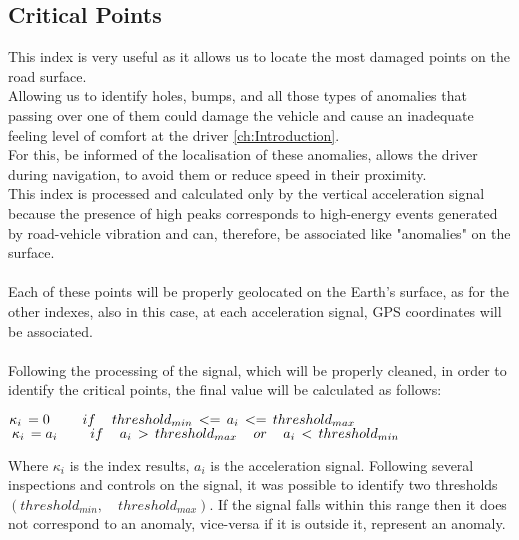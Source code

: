 \documentclass[tesi]{subfiles}
\begin{document}
\subsection{Critical Points}\label{ssc:Critical Points}
This index is very useful as it allows us to locate the most damaged points on the road surface.\\
\noindent Allowing us to identify holes, bumps, and all those types of anomalies that passing over one of them could damage the vehicle and cause an inadequate feeling level of comfort at the driver \ref{ch:Introduction}.\\For this, be informed of the localisation of these anomalies,  allows the driver during navigation, to avoid them or reduce speed in their proximity.\\
\noindent This index is processed and calculated only by the vertical acceleration signal because the presence of high peaks corresponds to high-energy events generated by road-vehicle vibration and can, therefore, be associated like "anomalies" on the surface.\\\\
\noindent Each of these points will be properly geolocated on the Earth's surface, as for the other indexes, also in this case, at each acceleration signal, GPS coordinates will be associated.	\\\\
\noindent Following the processing of the signal, which will be properly cleaned, in order to identify the critical points, the final value will be calculated as follows: 
\begin{center}
${\large \kappa_{i} \thinspace = 0 \qquad	if \quad	threshold_{min} \thinspace <= \thinspace a_{i} \thinspace <= \thinspace threshold_{max}}$\\

${\large \thinspace \kappa_{i} \thinspace = a_{i} \qquad if \quad a_{i} \thinspace > \thinspace threshold_{max} \quad or \quad a_{i} \thinspace < \thinspace threshold_{min}}$
\end{center}

\noindent Where $\kappa_{i}$ is the index results, $a_{i}$ is the acceleration signal. Following several inspections and controls on the signal, it was possible to identify two thresholds $\left(threshold_{min},\quad threshold_{max}\right)$. 
If the signal falls within this range then it does not correspond to an anomaly, vice-versa if it is outside it, represent an anomaly.\\\\
\end{document}
